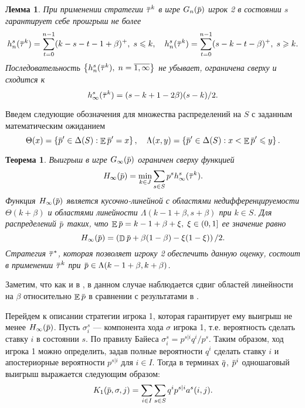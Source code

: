 \documentclass[12pt, draft]{extarticle}
\newtheorem{lemma}{Лемма}
\newtheorem{theorem}{Теорема}
\newcommand{\overbar}[1]%
{\mkern 1.5mu\overline{\mkern-1.3mu#1\mkern-1.3mu}\mkern 1.3mu}
\newcommand{\p}{\ensuremath{\overbar{p}}}
\newcommand{\q}{\ensuremath{\overbar{q}}}
\DeclareMathOperator{\E}{\mathbb{E}}
\DeclareMathOperator{\D}{\mathbb{D}}
\newcommand{\G}[1][n]{\ensuremath{G_{#1}}}
\newcommand{\K}[1][n]{\ensuremath{K_{#1}}}
\newcommand{\High}[1][\ensuremath{\infty}]{\ensuremath{H_{#1}}}
\newcommand{\tauv}{\ensuremath{\overbar{\tau}}}
\begin{document}
\begin{lemma}
  \label{upper-bound:lemma:vector-payoffs}
  При применении стратегии $\tauv^k$ в игре $\G(\p)$ игрок 2 в состоянии $s$
  гарантирует себе проигрыш не более
  \begin{gather*}
    h^s_n(\tauv^k) = \sum_{t=0}^{n-1} (k-s-t-1+\beta)^+, \; s \leqslant k, \quad
    h^s_n(\tauv^k) = \sum_{t=0}^{n-1} (s-k-t-\beta)^+, \; s \geqslant k.
  \end{gather*}
  Последовательность $\left\{ h^s_n(\tauv^k), \; n = \overline{1, \infty}
  \right\}$ не убывает, ограничена сверху и сходится к %
  \begin{equation}
    \label{upper-bound:eq:max-payoff}
    h^s_\infty(\tauv^k) = (s - k + 1 - 2\beta)(s-k)/2.
  \end{equation}
\end{lemma}

Введем следующие обозначения для множества распределений на $S$ с заданным
математическим ожиданием
\begin{equation*}
  \Theta(x) = \left\{ \p' \in \Delta(S): \E \p' = x \right\}, \quad
  \Lambda(x, y) = \left\{ \p' \in \Delta(S): x < \E \p' \leqslant y \right\}.
\end{equation*}

\begin{theorem}
  \label{upper-bound:theorem}
  Выигрыш в игре $\G[\infty](\p)$ ограничен сверху функцией
  \begin{equation*}
    \High(\p) = \min_{k \in J} \sum_{s \in S} p^s  h^s_\infty(\tauv^k).
  \end{equation*}
  Функция $\High(\p)$ является кусочно-линейной с областями недифференцируемости
  $\Theta(k+\beta)$ и областями линейности $\Lambda(k - 1 + \beta, s + \beta)$
  при $k \in S$. Для распределений $\p$ таких, что $\E \p = k - 1 + \beta + \xi,
  \; \xi \in (0, 1]$ ее значение равно
  \begin{equation}
    \label{upper-bound:eq:H(p)}
    \High(\p) = \left( \D \p + \beta(1-\beta) - \xi(1-\xi) \right)/2.
  \end{equation}
  Стратегия $\tauv^*$, которая позволяет игроку 2 обеспечить данную оценку,
  состоит в применении $\tauv^k$ при $\p \in \Lambda(k - 1 + \beta, k + \beta)$.
\end{theorem}
Заметим, что как и в \cite{bib:pyanykh16}, в данном случае наблюдается сдвиг
областей линейности на $\beta$ относительно $\E \p$ в сравнении с результатами в
\cite{bib:domansky11}.

Перейдем к описании стратегии игрока 1, которая гарантирует ему выигрыш не менее
$\High(\p)$. Пусть $\sigma^s_i$ --- компонента хода $\sigma$ игрока 1, т.е.
вероятность сделать ставку $i$ в состоянии $s$. По правилу Байеса $\sigma^s_i =
p^{s|i} q^i / p^s$. Таким образом, ход игрока 1 можно определить, задав полные
вероятности $q^i$ сделать ставку $i$ и апостериорные вероятности $p^{s|i}$ для
$i \in I$. Тогда в терминах $\q$, $\p^i$ одношаговый выигрыш выражается
следующим образом:
\begin{equation}
  \label{lower-bound:eq:K1(q,pi)}
  \K[1](\p, \sigma, j) = \sum_{i \in I} \sum_{s \in S} q^i p^{s|i} a^s(i, j).
\end{equation}
\end{document}
